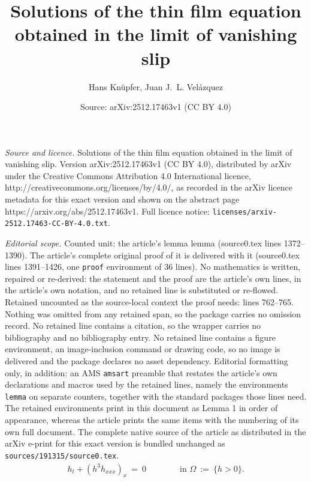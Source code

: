 \documentclass[10pt,a4paper]{amsart}
\title{Solutions of the thin film equation obtained in the limit of vanishing slip}
\author{Hans Knüpfer, Juan J.~L. Velázquez}
\date{Source: arXiv:2512.17463v1 (CC BY 4.0)}
\newcommand{\Ome}{\Omega}
\begin{document}
\maketitle

\noindent\emph{Source and licence.} Solutions of the thin film equation obtained in the limit of vanishing slip. Version arXiv:2512.17463v1 (CC BY 4.0), distributed by arXiv under the Creative Commons Attribution 4.0 International licence, http://creativecommons.org/licenses/by/4.0/, as recorded in the arXiv licence metadata for this exact version and shown on the abstract page https://arxiv.org/abs/2512.17463v1. Full licence notice: \texttt{licenses/arxiv-2512.17463-CC-BY-4.0.txt}.\par\smallskip

\noindent\textit{Editorial scope.} Counted unit: the article's lemma lemma (source0.tex lines 1372--1390). The article's complete original proof of it is delivered with it (source0.tex lines 1391--1426, one \texttt{proof} environment of 36 lines). No mathematics is written, repaired or re-derived: the statement and the proof are the article's own lines, in the article's own notation, and no retained line is substituted or re-flowed.  Retained uncounted as the source-local context the proof needs: lines 762--765.  Nothing was omitted from any retained span, so the package carries no omission record.  No retained line contains a citation, so the wrapper carries no bibliography and no bibliography entry.  No retained line contains a figure environment, an image-inclusion command or drawing code, so no image is delivered and the package declares no asset dependency.  Editorial formatting only, in addition: an AMS \texttt{amsart} preamble that restates the article's own declarations and macros used by the retained lines, namely the environments \texttt{lemma} on separate counters, together with the standard packages those lines need.  The retained environments print in this document as Lemma 1 in order of appearance, whereas the article prints the same items with the numbering of its own full document.  The complete native source of the article as distributed in the arXiv e-print for this exact version is bundled unchanged as \texttt{sources/191315/source0.tex}.
\begin{align} \label{tfe-noslip} 
    h_t +(h^3 h_{xxx})_x \ = \ 0 \qquad\qquad %
  \text{in $\Ome \ := \ \{h>0\}$.}
\end{align}
\end{document}
